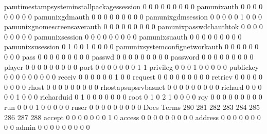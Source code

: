 \documentclass[compress,8pt]{beamer}
\begin{document}
\begin{frame}
\begin{Schunk}
  pamtimestampsysteminstallpackagessession   0   0   0   0   0   0   0   0   0
  pamunixauth                                0   0   0   0   0   0   0   0   0
  pamunixgdmauth                             0   0   0   0   0   0   0   0   0
  pamunixgdmsession                          0   0   0   0   0   1   0   0   0
  pamunixgnomescreensaverauth                0   0   0   0   0   0   0   0   0
  pamunixpasswdchauthtok                     0   0   0   0   0   0   0   0   0
  pamunixsession                             0   0   0   0   0   0   0   0   0
  pamunixsuauth                              0   0   0   0   0   0   0   0   0
  pamunixsusession                           0   1   0   0   1   0   0   0   0
  pamunixsystemconfignetworkauth             0   0   0   0   0   0   0   0   0
  pass                                       0   0   0   0   0   0   0   0   0
  passwd                                     0   0   0   0   0   0   0   0   0
  password                                   0   0   0   0   0   0   0   0   0
  player                                     0   0   0   0   0   0   0   0   0
  port                                       0   0   0   0   0   0   0   1   1
  privileg                                   0   0   0   1   0   0   0   0   0
  publickey                                  0   0   0   0   0   0   0   0   0
  receiv                                     0   0   0   0   0   0   1   0   0
  request                                    0   0   0   0   0   0   0   0   0
  retriev                                    0   0   0   0   0   0   0   0   0
  rhost                                      0   0   0   0   0   0   0   0   0
  rhostapsupsrvbasnet                        0   0   0   0   0   0   0   0   0
  richard                                    0   0   0   0   0   1   0   0   0
  richarduid                                 0   1   0   0   0   0   0   0   0
  root                                       0   1   0   2   1   0   0   0   0
  roy                                        0   0   0   0   0   0   0   0   0
  run                                        0   0   0   1   0   0   0   0   0
  ruser                                      0   0   0   0   0   0   0   0   0
                                          Docs
Terms                                      280 281 282 283 284 285 286 287 288
  accept                                     0   0   0   0   0   0   0   1   0
  access                                     0   0   0   0   0   0   0   0   0
  address                                    0   0   0   0   0   0   0   0   0
  admin                                      0   0   0   0   0   0   0   0   0

\end{Schunk}
\end{frame}
\end{document}
